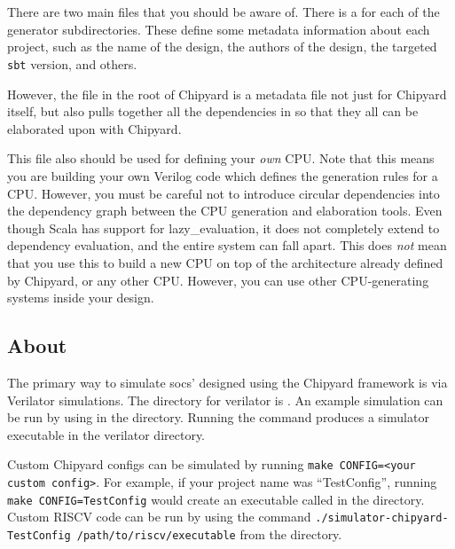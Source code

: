 \section{}\label{sec:build.sbt}
There are two main  files that you should be aware of.
There is a  for each of the generator subdirectories.
These define some metadata information about each project, such as the name of the design, the authors of the design, the targeted \texttt{sbt} version, and others.

However, the  file in the root of Chipyard is a metadata file not just for Chipyard itself, but also pulls together all the dependencies in  so that they all can be elaborated upon with Chipyard.

This file also should be used for defining your \emph{own} CPU.\@
Note that this means you are building your own Verilog code which defines the generation rules for a CPU.\@
However, you must be careful not to introduce circular dependencies into the dependency graph between the CPU generation and elaboration tools.
Even though Scala has support for \gls{lazy_evaluation}, it does not completely extend to dependency evaluation, and the entire system can fall apart.
This does \emph{not} mean that you use this to build a new CPU on top of the architecture already defined by Chipyard, or any other CPU.\@
However, you can use other CPU-generating systems inside your design.

\subsection{About}\label{sec:About_Verilator_Simulator}
The primary way to simulate \Glspl{soc}' designed using the Chipyard framework is via Verilator simulations.
The directory for verilator is .
An example simulation can be run by using  in the  directory.
Running the  command produces a simulator executable in the verilator directory.

Custom Chipyard configs can be simulated by running \texttt{make CONFIG=<your custom config>}.
For example, if your project name was ``TestConfig'', running \texttt{make CONFIG=TestConfig} would create an executable called  in the  directory.
Custom RISCV code can be run by using the command \texttt{./simulator-chipyard-TestConfig /path/to/riscv/executable} from the  directory.

